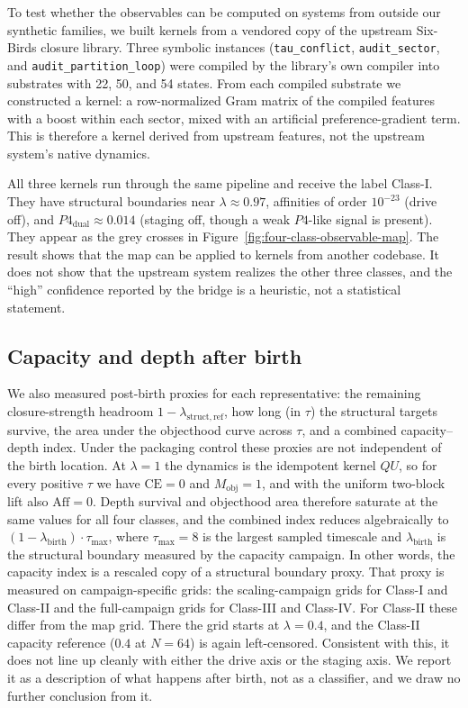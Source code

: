 To test whether the observables can be computed on systems from outside our synthetic families, we built kernels from a vendored copy of the upstream Six-Birds closure library. Three symbolic instances (\texttt{tau\_conflict}, \texttt{audit\_sector}, and \texttt{audit\_partition\_loop}) were compiled by the library's own compiler into substrates with 22, 50, and 54 states. From each compiled substrate we constructed a kernel: a row-normalized Gram matrix of the compiled features with a boost within each sector, mixed with an artificial preference-gradient term. This is therefore a kernel derived from upstream features, not the upstream system's native dynamics.

All three kernels run through the same pipeline and receive the label Class-I. They have structural boundaries near $\lambda\approx0.97$, affinities of order $10^{-23}$ (drive off), and $P4_{\mathrm{dual}}\approx0.014$ (staging off, though a weak $P4$-like signal is present). They appear as the grey crosses in Figure~\ref{fig:four-class-observable-map}. The result shows that the map can be applied to kernels from another codebase. It does not show that the upstream system realizes the other three classes, and the ``high'' confidence reported by the bridge is a heuristic, not a statistical statement.

\subsection{Capacity and depth after birth}

We also measured post-birth proxies for each representative: the remaining closure-strength headroom $1-\lambda_{\mathrm{struct,ref}}$, how long (in $\tau$) the structural targets survive, the area under the objecthood curve across $\tau$, and a combined capacity--depth index. Under the packaging control these proxies are not independent of the birth location. At $\lambda=1$ the dynamics is the idempotent kernel $QU$, so for every positive $\tau$ we have $\mathrm{CE}=0$ and $M_{\mathrm{obj}}=1$, and with the uniform two-block lift also $\mathrm{Aff}=0$. Depth survival and objecthood area therefore saturate at the same values for all four classes, and the combined index reduces algebraically to $(1-\lambda_{\mathrm{birth}})\cdot\tau_{\max}$, where $\tau_{\max}=8$ is the largest sampled timescale and $\lambda_{\mathrm{birth}}$ is the structural boundary measured by the capacity campaign. In other words, the capacity index is a rescaled copy of a structural boundary proxy. That proxy is measured on campaign-specific grids: the scaling-campaign grids for Class-I and Class-II and the full-campaign grids for Class-III and Class-IV. For Class-II these differ from the map grid. There the grid starts at $\lambda=0.4$, and the Class-II capacity reference ($0.4$ at $N=64$) is again left-censored. Consistent with this, it does not line up cleanly with either the drive axis or the staging axis. We report it as a description of what happens after birth, not as a classifier, and we draw no further conclusion from it.
